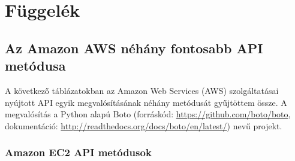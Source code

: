 \appendix
\chapter*{Függelék}
\setcounter{chapter}{6}  %
\setcounter{equation}{0} %

\section{Az Amazon AWS néhány fontosabb API metódusa}\label{sec:appendix_amazonaws}

A következő táblázatokban az Amazon Web Services (AWS) szolgáltatásai nyújtott API egyik megvalósításának néhány metódusát gyűjtöttem össze. A megvalósítás a Python alapú Boto (forráskód: \href{https://github.com/boto/boto}{https://github.com/boto/boto}, dokumentáció: \href{http://readthedocs.org/docs/boto/en/latest/}{http://readthedocs.org/docs/boto/en/latest/}) nevű projekt.

\subsection{Amazon EC2 API metódusok}

